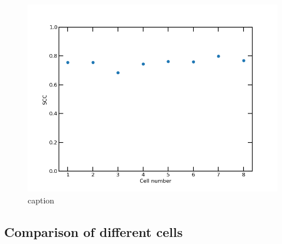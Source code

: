 \documentclass[10pt,abstract=true,titlepage=false,toc=bib]{scrartcl}
\begin{document}
\begin{figure}[ht]
\centering
	\includegraphics[width=14cm]{hic-vs-sim-scc.png}
	\caption{caption}
	\label{img:hic-vs-sim-scc}
\end{figure}


\subsection{Comparison of different cells} %
\label{sub:comparison_of_different_cells}





\newpage
\printbibliography
\end{document}
